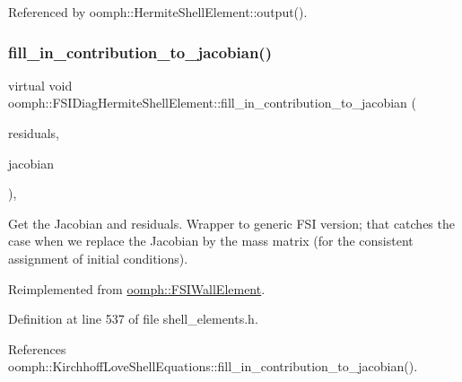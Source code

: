 Referenced by oomph\+::\+Hermite\+Shell\+Element\+::output().

\mbox{\label{classoomph_1_1FSIDiagHermiteShellElement_a5e48d1c0291cf16cacaa8b42112efe90}} 
\subsubsection{\texorpdfstring{fill\+\_\+in\+\_\+contribution\+\_\+to\+\_\+jacobian()}{fill\_in\_contribution\_to\_jacobian()}}
{\footnotesize\ttfamily virtual void oomph\+::\+F\+S\+I\+Diag\+Hermite\+Shell\+Element\+::fill\+\_\+in\+\_\+contribution\+\_\+to\+\_\+jacobian (\begin{DoxyParamCaption}\item[{\hyperlink{classoomph_1_1Vector}{Vector}$<$ double $>$ \&}]{residuals,  }\item[{\hyperlink{classoomph_1_1DenseMatrix}{Dense\+Matrix}$<$ double $>$ \&}]{jacobian }\end{DoxyParamCaption})\hspace{0.3cm}{\ttfamily [inline]}, {\ttfamily [virtual]}}



Get the Jacobian and residuals. Wrapper to generic F\+SI version; that catches the case when we replace the Jacobian by the mass matrix (for the consistent assignment of initial conditions). 



Reimplemented from \hyperlink{classoomph_1_1FSIWallElement_a7817d2662c24540d3757cb1a1194a635}{oomph\+::\+F\+S\+I\+Wall\+Element}.



Definition at line 537 of file shell\+\_\+elements.\+h.



References oomph\+::\+Kirchhoff\+Love\+Shell\+Equations\+::fill\+\_\+in\+\_\+contribution\+\_\+to\+\_\+jacobian().

\mbox{\label{classoomph_1_1FSIDiagHermiteShellElement_acf4aa46e9dc8969dbb409c761d457fd7}} 
